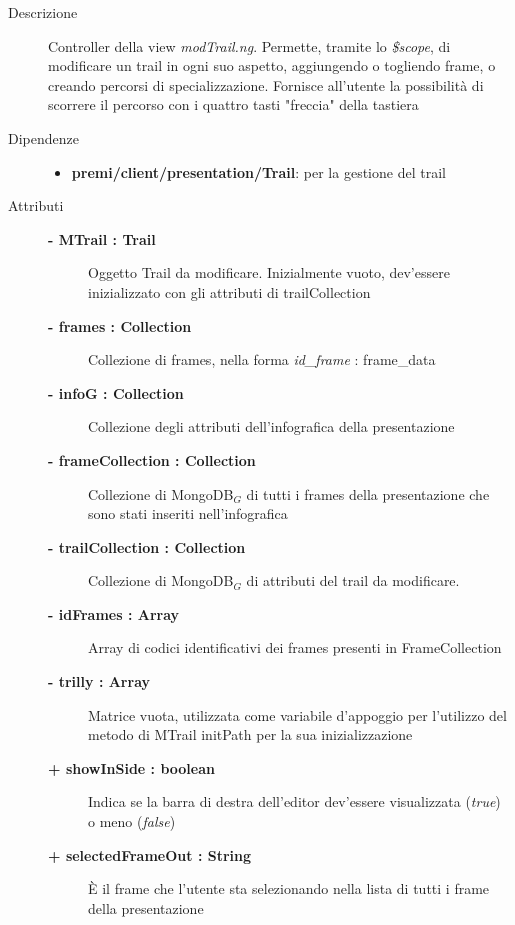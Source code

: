 \begin{description}
\item[Descrizione] \hfill
	Controller della view \textit{modTrail.ng}. Permette, tramite lo \textit{\$scope}, di modificare un trail in ogni suo aspetto, aggiungendo o togliendo frame, o creando percorsi di specializzazione. Fornisce all'utente la possibilità di scorrere il percorso con i quattro tasti "freccia" della tastiera
	
	
\item[Dipendenze] \hfill
	\begin{itemize}
		\item \textbf{premi/client/presentation/Trail}: per la gestione del trail
	\end{itemize}
	
	
\item[Attributi] \hfill
	\begin{description}
		\item[\textbf{- MTrail : Trail			}] \hfill
			Oggetto Trail da modificare. Inizialmente vuoto, dev'essere inizializzato con gli attributi di trailCollection
		\item[\textbf{- frames : Collection			}] \hfill
			Collezione di frames, nella forma \textit{id\_frame} : frame\_data
		\item[\textbf{- infoG : Collection			}] \hfill
			Collezione degli attributi dell'infografica della presentazione
		\item[\textbf{- frameCollection : Collection			}] \hfill
			Collezione di MongoDB$_G$ di tutti i frames della presentazione che sono stati inseriti nell'infografica
		\item[\textbf{- trailCollection : Collection			}] \hfill
			Collezione di MongoDB$_G$ di attributi del trail da modificare.
		\item[\textbf{- idFrames : Array			}] \hfill
			Array di codici identificativi dei frames presenti in FrameCollection
		\item[\textbf{- trilly : Array			}] \hfill
			Matrice vuota, utilizzata come variabile d'appoggio per l'utilizzo del metodo di MTrail initPath per la sua inizializzazione
		\item[\textbf{+ showInSide : boolean			}] \hfill
			Indica se la barra di destra dell'editor dev'essere visualizzata (\textit{true}) o meno (\textit{false})
		\item[\textbf{+ selectedFrameOut : String			}] \hfill
			È il frame che l'utente sta selezionando nella lista di tutti i frame della presentazione
	\end{description}
	

\end{description}
